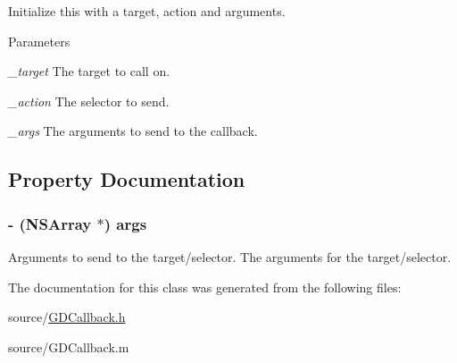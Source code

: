 Initialize this with a target, action and arguments. 
\begin{DoxyParams}{Parameters}
\item[{\em \_\-target}]The target to call on. \item[{\em \_\-action}]The selector to send. \item[{\em \_\-args}]The arguments to send to the callback. \end{DoxyParams}


\subsection{Property Documentation}
\hypertarget{interface_g_d_callback_a96dccd3a137501fccc5465f088330df1}{
\subsubsection[{args}]{\setlength{\rightskip}{0pt plus 5cm}-\/ (NSArray $\ast$) args}}
\label{interface_g_d_callback_a96dccd3a137501fccc5465f088330df1}


Arguments to send to the target/selector. The arguments for the target/selector. 

The documentation for this class was generated from the following files:\begin{DoxyCompactItemize}
\item 
source/\hyperlink{_g_d_callback_8h}{GDCallback.h}\item 
source/GDCallback.m\end{DoxyCompactItemize}
